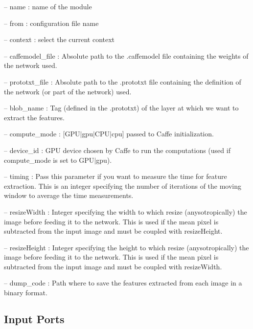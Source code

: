\begin{DoxyItemize}
\item -- name \+: name of the module
\item -- from \+: configuration file name
\item -- context \+: select the current context
\item -- caffemodel\+\_\+file \+: Absolute path to the .caffemodel file containing the weights of the network used.
\item -- prototxt\+\_\+file \+: Absolute path to the .prototxt file containing the definition of the network (or part of the network) used.
\item -- blob\+\_\+name \+: Tag (defined in the .prototxt) of the layer at which we want to extract the features.
\item -- compute\+\_\+mode \+: \mbox{[}G\+P\+U$\vert$gpu$\vert$\+C\+P\+U$\vert$cpu\mbox{]} passed to Caffe initialization.
\item -- device\+\_\+id \+: G\+PU device chosen by Caffe to run the computations (used if compute\+\_\+mode is set to G\+P\+U$\vert$gpu).
\item -- timing \+: Pass this parameter if you want to measure the time for feature extraction. This is an integer specifying the number of iterations of the moving window to average the time measurements.
\item -- resize\+Width \+: Integer specifying the width to which resize (anysotropically) the image before feeding it to the network. This is used if the mean pixel is subtracted from the input image and must be coupled with {\ttfamily resize\+Height}.
\item -- resize\+Height \+: Integer specifying the height to which resize (anysotropically) the image before feeding it to the network. This is used if the mean pixel is subtracted from the input image and must be coupled with {\ttfamily resize\+Width}.
\item -- dump\+\_\+code \+: Path where to save the features extracted from each image in a binary format. 
\end{DoxyItemize}\hypertarget{group__GIECoder_inputports_sec}{}\subsection{Input Ports}\label{group__GIECoder_inputports_sec}

